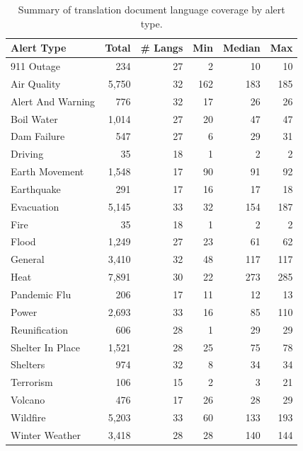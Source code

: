 \begin{table}
\centering
\setlength{\tabcolsep}{3pt}
\renewcommand{\arraystretch}{0.95}
\begin{tabular}{lrrrrr}
\toprule
\textbf{Alert Type} & \textbf{Total} & \textbf{\# Langs} & \textbf{Min} & \textbf{Median} & \textbf{Max} \\
\midrule
911 Outage & 234 & 27 & 2 & 10 & 10 \\
Air Quality & 5,750 & 32 & 162 & 183 & 185 \\
Alert And Warning & 776 & 32 & 17 & 26 & 26 \\
Boil Water & 1,014 & 27 & 20 & 47 & 47 \\
Dam Failure & 547 & 27 & 6 & 29 & 31 \\
Driving & 35 & 18 & 1 & 2 & 2 \\
Earth Movement & 1,548 & 17 & 90 & 91 & 92 \\
Earthquake & 291 & 17 & 16 & 17 & 18 \\
Evacuation & 5,145 & 33 & 32 & 154 & 187 \\
Fire & 35 & 18 & 1 & 2 & 2 \\
Flood & 1,249 & 27 & 23 & 61 & 62 \\
General & 3,410 & 32 & 48 & 117 & 117 \\
Heat & 7,891 & 30 & 22 & 273 & 285 \\
Pandemic Flu & 206 & 17 & 11 & 12 & 13 \\
Power & 2,693 & 33 & 16 & 85 & 110 \\
Reunification & 606 & 28 & 1 & 29 & 29 \\
Shelter In Place & 1,521 & 28 & 25 & 75 & 78 \\
Shelters & 974 & 32 & 8 & 34 & 34 \\
Terrorism & 106 & 15 & 2 & 3 & 21 \\
Volcano & 476 & 17 & 26 & 28 & 29 \\
Wildfire & 5,203 & 33 & 60 & 133 & 193 \\
Winter Weather & 3,418 & 28 & 28 & 140 & 144 \\
\bottomrule
\end{tabular}
\caption{Summary of translation document language coverage by alert type.}
\label{tab:combined_translations_per_alert_lang_summary}
\end{table}